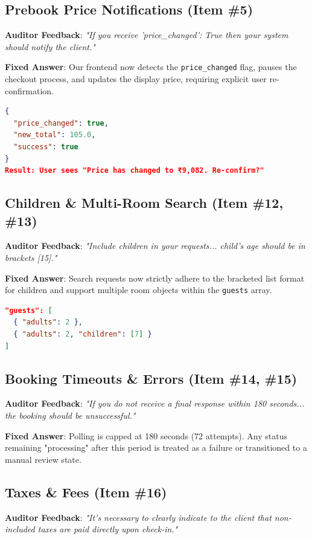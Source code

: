 \documentclass[11pt,a4paper]{article}
\begin{document}
\subsection{Prebook Price Notifications (Item \#5)}
\textbf{Auditor Feedback}: \textit{"If you receive 'price\_changed': True then your system should notify the client."}

\textbf{Fixed Answer}: Our frontend now detects the \texttt{price\_changed} flag, pauses the checkout process, and updates the display price, requiring explicit user re-confirmation.
\begin{lstlisting}[language=json, caption=Prebook Response simulation]
{
  "price_changed": true,
  "new_total": 105.0,
  "success": true
}
Result: User sees "Price has changed to ₹9,082. Re-confirm?"
\end{lstlisting}

\subsection{Children \& Multi-Room Search (Item \#12, \#13)}
\textbf{Auditor Feedback}: \textit{"Include children in your requests... child’s age should be in brackets [15]."}

\textbf{Fixed Answer}: Search requests now strictly adhere to the bracketed list format for children and support multiple room objects within the \texttt{guests} array.
\begin{lstlisting}[language=json, caption=Search JSON Payload verification]
"guests": [
  { "adults": 2 },
  { "adults": 2, "children": [7] }
]
\end{lstlisting}

\subsection{Booking Timeouts \& Errors (Item \#14, \#15)}
\textbf{Auditor Feedback}: \textit{"If you do not receive a final response within 180 seconds... the booking should be unsuccessful."}

\textbf{Fixed Answer}: Polling is capped at 180 seconds (72 attempts). Any status remaining "processing" after this period is treated as a failure or transitioned to a manual review state.

\subsection{Taxes \& Fees (Item \#16)}
\textbf{Auditor Feedback}: \textit{"It's necessary to clearly indicate to the client that non-included taxes are paid directly upon check-in."}
\end{document}
